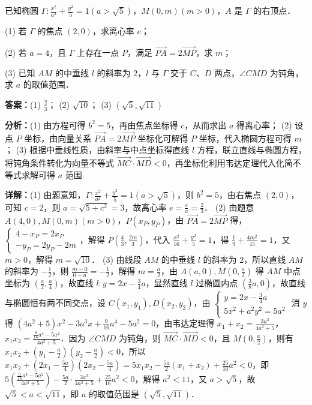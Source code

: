 \begin{question}[points=18]
已知椭圆 $\Gamma: \frac{x^2}{a^2} + \frac{y^2}{5} = 1 (a > \sqrt{5})$，$M(0, m) (m > 0)$，$A$ 是 $\Gamma$ 的右顶点．

(1) 若 $\Gamma$ 的焦点 $(2,0)$，求离心率 $e$；

(2) 若 $a = 4$，且 $\Gamma$ 上存在一点 $P$，满足 $\overrightarrow{PA} = 2\overrightarrow{MP}$，求 $m$；

(3) 已知 $AM$ 的中垂线 $l$ 的斜率为 $2$，$l$ 与 $\Gamma$ 交于 $C$、$D$ 两点，$\angle CMD$ 为钝角，求 $a$ 的取值范围．
\begin{solution}
\textbf{答案：}(1) $\frac{2}{3}$； (2) $\sqrt{10}$； (3) $(\sqrt{5}, \sqrt{11})$

\textbf{分析：}(1) 由方程可得 $b^2 = 5$，再由焦点坐标得 $c$，从而求出 $a$ 得离心率； (2) 设点 $P$ 坐标，由向量关系 $\overrightarrow{PA} = 2\overrightarrow{MP}$ 坐标化可解得 $P$ 坐标，代入椭圆方程可得 $m$； (3) 根据中垂线性质，由斜率与中点坐标得直线 $l$ 方程，联立直线与椭圆方程，将钝角条件转化为向量不等式 $\overrightarrow{MC} \cdot \overrightarrow{MD} < 0$，再坐标化利用韦达定理代入化简不等式求解可得 $a$ 范围.

\textbf{详解：}(1) 由题意知，$\Gamma: \frac{x^2}{a^2} + \frac{y^2}{5} = 1 (a > \sqrt{5})$，则 $b^2 = 5$，由右焦点 $(2,0)$，可知 $c = 2$，则 $a = \sqrt{5 + c^2} = 3$，故离心率 $e = \frac{c}{a} = \frac{2}{3}$．
(2) 由题意 $A(4,0), M(0, m) (m > 0)$，$P(x_P, y_P)$，由 $\overrightarrow{PA} = 2\overrightarrow{MP}$ 得，$\begin{cases} 4 - x_P = 2x_P \\ -y_P = 2y_P - 2m \end{cases}$，解得 $P\left(\frac{4}{3}, \frac{2m}{3}\right)$，代入 $\frac{x^2}{16} + \frac{y^2}{5} = 1$，得 $\frac{1}{9} + \frac{4m^2}{45} = 1$，又 $m > 0$，解得 $m = \sqrt{10}$．
(3) 由线段 $AM$ 的中垂线 $l$ 的斜率为 $2$，所以直线 $AM$ 的斜率为 $-\frac{1}{2}$，则 $\frac{m-0}{0-a} = -\frac{1}{2}$，解得 $m = \frac{a}{2}$，由 $A(a,0), M(0, \frac{a}{2})$ 得 $AM$ 中点坐标为 $(\frac{a}{2}, \frac{a}{4})$，故直线 $l: y = 2x - \frac{3}{4}a$，显然直线 $l$ 过椭圆内点 $(\frac{3}{8}a, 0)$，故直线与椭圆恒有两不同交点，设 $C(x_1, y_1), D(x_2, y_2)$，由 $\begin{cases} y = 2x - \frac{3}{4}a \\ 5x^2 + a^2 y^2 = 5a^2 \end{cases}$ 消 $y$ 得 $(4a^2 + 5)x^2 - 3a^3 x + \frac{9}{16}a^4 - 5a^2 = 0$，由韦达定理得 $x_1 + x_2 = \frac{3a^3}{4a^2 + 5}$，$x_1 x_2 = \frac{\frac{9}{16}a^4 - 5a^2}{4a^2 + 5}$．因为 $\angle CMD$ 为钝角，则 $\overrightarrow{MC} \cdot \overrightarrow{MD} < 0$，且 $M(0, \frac{a}{2})$，则有 $x_1 x_2 + (y_1 - \frac{a}{2})(y_2 - \frac{a}{2}) < 0$，所以 $x_1 x_2 + \left(2x_1 - \frac{5a}{4}\right)\left(2x_2 - \frac{5a}{4}\right) = 5x_1 x_2 - \frac{5a}{2}(x_1 + x_2) + \frac{25}{16}a^2 < 0$，即 $5\left(\frac{\frac{9}{16}a^4 - 5a^2}{4a^2 + 5}\right) - \frac{5a}{2} \cdot \frac{3a^3}{4a^2 + 5} + \frac{25}{16}a^2 < 0$，解得 $a^2 < 11$，又 $a > \sqrt{5}$，故 $\sqrt{5} < a < \sqrt{11}$，即 $a$ 的取值范围是 $(\sqrt{5}, \sqrt{11})$．
\end{solution}
\end{question}

